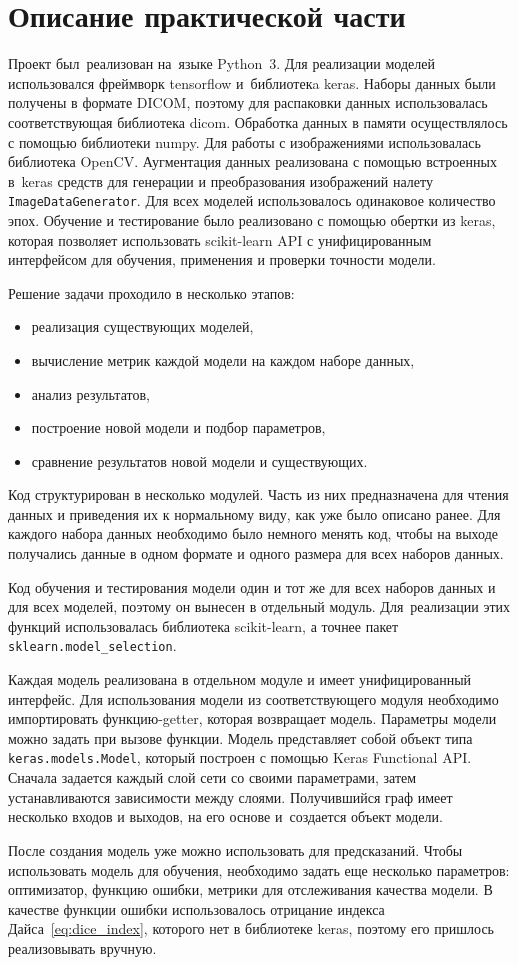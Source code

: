 \section{Описание практической части}

Проект был~реализован на~языке Python~3. Для реализации моделей использовался фреймворк tensorflow и~библиотекa keras. Наборы данных были получены в формате DICOM, поэтому для распаковки данных использовалась соответствующая библиотека dicom. Обработка данных в памяти осуществлялось с помощью библиотеки numpy. Для работы с изображениями использовалась библиотека OpenCV. Аугментация данных реализована с помощью встроенных в~keras средств для генерации и преобразования изображений налету \texttt{ImageDataGenerator}. Для всех моделей использовалось одинаковое количество эпох. Обучение и тестирование было реализовано с помощью обертки из keras, которая позволяет использовать scikit-learn API с унифицированным интерфейсом для обучения, применения и проверки точности модели.

Решение задачи проходило в несколько этапов:

\begin{itemize}
  \item реализация существующих моделей,
  \item вычисление метрик каждой модели на каждом наборе данных,
  \item анализ результатов,
  \item построение новой модели и подбор параметров,
  \item сравнение результатов новой модели и существующих.
\end{itemize}

Код структурирован в несколько модулей. Часть из них предназначена для чтения данных и приведения их к нормальному виду, как уже было описано ранее. Для каждого набора данных необходимо было немного менять код, чтобы на выходе получались данные в одном формате и одного размера для всех наборов данных.

Код обучения и тестирования модели один и тот же для всех наборов данных и для всех моделей, поэтому он вынесен в отдельный модуль. Для~реализации этих функций использовалась библиотека scikit-learn, а точнее пакет \texttt{sklearn.model\_selection}.

Каждая модель реализована в отдельном модуле и имеет унифицированный интерфейс. Для использования модели из соответствующего модуля необходимо импортировать функцию-getter, которая возвращает модель. Параметры модели можно задать при вызове функции. Модель представляет собой объект типа \texttt{keras.models.Model}, который построен с помощью Keras Functional API. Сначала задается каждый слой сети со своими параметрами, затем устанавливаются зависимости между слоями. Получившийся граф имеет несколько входов и выходов, на его основе и~создается объект модели. 

После создания модель уже можно использовать для предсказаний. Чтобы использовать модель для обучения, необходимо задать еще несколько параметров: оптимизатор, функцию ошибки, метрики для отслеживания качества модели. В качестве функции ошибки использовалось отрицание индекса Дайса~\eqref{eq:dice_index}, которого нет в библиотеке keras, поэтому его пришлось реализовывать вручную.
